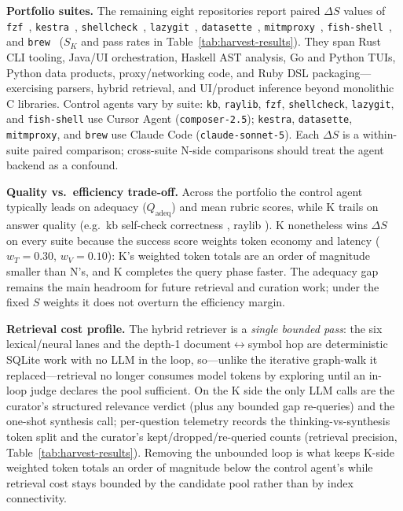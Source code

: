 \medskip
\noindent\textbf{Portfolio suites.}
The remaining eight repositories report paired $\Delta S$ values of
\texttt{fzf}~\FzfDeltaS, \texttt{kestra}~\KestraDeltaS,
\texttt{shellcheck}~\ShellcheckDeltaS, \texttt{lazygit}~\LazygitDeltaS,
\texttt{datasette}~\DatasetteDeltaS, \texttt{mitmproxy}~\MitmproxyDeltaS,
\texttt{fish-shell}~\FishShellDeltaS, and \texttt{brew}~\BrewDeltaS{}
($S_K$ and pass rates in Table~\ref{tab:harvest-results}).
They span Rust CLI tooling, Java/UI orchestration, Haskell AST analysis,
Go and Python TUIs, Python data products, proxy/networking code, and Ruby DSL
packaging---exercising parsers, hybrid retrieval, and UI/product inference beyond
monolithic C libraries.
Control agents vary by suite: \texttt{kb}, \texttt{raylib}, \texttt{fzf},
\texttt{shellcheck}, \texttt{lazygit}, and \texttt{fish-shell} use Cursor Agent
(\texttt{composer-2.5}); \texttt{kestra}, \texttt{datasette}, \texttt{mitmproxy},
and \texttt{brew} use Claude Code (\texttt{claude-sonnet-5}).
Each $\Delta S$ is a within-suite paired comparison; cross-suite N-side
comparisons should treat the agent backend as a confound.

\medskip
\noindent\textbf{Quality vs.\ efficiency trade-off.}  Across the portfolio the
control agent typically leads on adequacy ($Q_{\text{adeq}}$) and mean rubric
scores, while K trails on answer quality (e.g.\ kb self-check correctness
\KbSelfCheckKCorrectness{}, raylib \RaylibKCorrectness{}).
K nonetheless wins $\Delta S$ on every suite because the success score weights
token economy and latency ($w_T{=}0.30$, $w_V{=}0.10$): K's weighted token totals
are an order of magnitude smaller than N's, and K completes the query phase
faster.  The adequacy gap remains the main headroom for future retrieval and
curation work; under the fixed $S$ weights it does not overturn the efficiency
margin.

\medskip
\noindent\textbf{Retrieval cost profile.}  The hybrid retriever is a
\emph{single bounded pass}: the six lexical/neural lanes and the depth-1
document$\leftrightarrow$symbol hop are deterministic SQLite work with no LLM in
the loop, so---unlike the iterative graph-walk it replaced---retrieval no longer
consumes model tokens by exploring until an in-loop judge declares the pool
sufficient.  On the K side the only LLM calls are the curator's structured
relevance verdict (plus any bounded gap re-queries) and the one-shot synthesis
call; per-question telemetry records the thinking-vs-synthesis token split and
the curator's kept/dropped/re-queried counts (retrieval precision,
Table~\ref{tab:harvest-results}).  Removing the unbounded loop is what keeps
K-side weighted token totals an order of magnitude below the control agent's
while retrieval cost stays bounded by the candidate pool rather than by index
connectivity.
